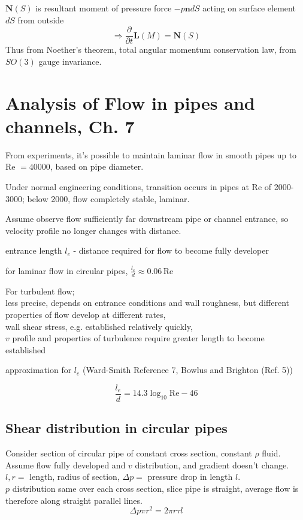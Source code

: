 \documentclass[twoside,landscape,10pt]{amsart}
\theoremstyle{plain}
\theoremstyle{definition}
\theoremstyle{remark}
\theoremstyle{remark}
\begin{document}
\begin{multicols*}{2}
$\mathbf{N}(S)$ is resultant moment of pressure force $-p\mathbf{n}dS$ acting on surface element $dS$ from outside
\[
\Longrightarrow \frac{ \partial }{ \partial t} \mathbf{L}(M) = \mathbf{N}(S)
\]
Thus from Noether's theorem, total angular momentum conservation law, from $SO(3)$ gauge invariance.  


\section{Analysis of Flow in pipes and channels, Ch. 7}

From experiments, it's possible to maintain laminar flow in smooth pipes up to Re $ = 40000$, based on pipe diameter. 

Under normal engineering conditions, transition occurs in pipes at Re of 2000-3000; below 2000, flow completely stable, laminar. 

Assume observe flow sufficiently far downstream pipe or channel entrance, so velocity profile no longer changes with distance. 

entrance length $l_e$ - distance required for flow to become fully developer

for laminar flow in circular pipes, $\frac{l_e}{d} \approx 0.06 \, \text{Re}$

For turbulent flow; \\
less precise, depends on entrance conditions and wall roughness, but different properties of flow develop at different rates, \\
wall shear stress, e.g. established relatively quickly, \\
$v$ profile and properties of turbulence require greater length to become established

approximation for $l_e$ (Ward-Smith Reference 7, Bowlus and Brighton (Ref. 5)) 

\[
\frac{l_e}{d} = 14.3 \log_{10}{\text{Re}} - 46
\]

\subsection{Shear distribution in circular pipes}

Consider section of circular pipe of constant cross section, constant $\rho$ fluid. \\
Assume flow fully developed and $v$ distribution, and gradient doesn't change. \\
$l, r = $ length, radius of section, $\Delta p = $ pressure drop in length $l$. \\
$p$ distribution same over each cross section, slice pipe is straight, average flow is therefore along straight parallel lines. 
\[
\Delta p \pi r^2 = 2\pi r \tau l
\]


\end{multicols*}
\end{document}
